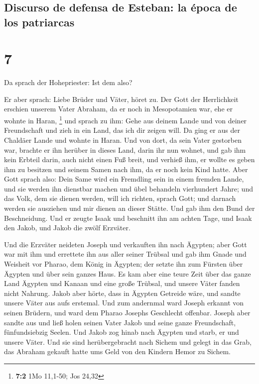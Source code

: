 \hypertarget{discurso-de-defensa-de-esteban-la-uxe9poca-de-los-patriarcas}{%
\subsection{Discurso de defensa de Esteban: la época de los
patriarcas}\label{discurso-de-defensa-de-esteban-la-uxe9poca-de-los-patriarcas}}

\hypertarget{section-6}{%
\section{7}\label{section-6}}

 Da sprach der Hohepriester: Ist dem also?

 Er aber sprach: Liebe Brüder und Väter, höret zu. Der
Gott der Herrlichkeit erschien unserem Vater Abraham, da er noch in
Mesopotamien war, ehe er wohnte in Haran, \footnote{\textbf{7:2} 1Mo
  11,1-50; Jos 24,32}  und sprach zu ihm: Gehe aus deinem
Lande und von deiner Freundschaft und zieh in ein Land, das ich dir
zeigen will.  Da ging er aus der Chaldäer Lande und wohnte
in Haran. Und von dort, da sein Vater gestorben war, brachte er ihn
herüber in dieses Land, darin ihr nun wohnet,  und gab ihm
kein Erbteil darin, auch nicht einen Fuß breit, und verhieß ihm, er
wollte es geben ihm zu besitzen und seinem Samen nach ihm, da er noch
kein Kind hatte.  Aber Gott sprach also: Dein Same wird
ein Fremdling sein in einem fremden Lande, und sie werden ihn dienstbar
machen und übel behandeln vierhundert Jahre;  und das
Volk, dem sie dienen werden, will ich richten, sprach Gott; und darnach
werden sie ausziehen und mir dienen an dieser Stätte.  Und
gab ihm den Bund der Beschneidung. Und er zeugte Isaak und beschnitt ihn
am achten Tage, und Isaak den Jakob, und Jakob die zwölf Erzväter.

 Und die Erzväter neideten Joseph und verkauften ihn nach
Ägypten; aber Gott war mit ihm  und errettete ihn aus
aller seiner Trübsal und gab ihm Gnade und Weisheit vor Pharao, dem
König in Ägypten; der setzte ihn zum Fürsten über Ägypten und über sein
ganzes Haus.  Es kam aber eine teure Zeit über das ganze
Land Ägypten und Kanaan und eine große Trübsal, und unsere Väter fanden
nicht Nahrung.  Jakob aber hörte, dass in Ägypten
Getreide wäre, und sandte unsere Väter aus aufs erstemal.
 Und zum andernmal ward Joseph erkannt von seinen
Brüdern, und ward dem Pharao Josephs Geschlecht offenbar.
 Joseph aber sandte aus und ließ holen seinen Vater Jakob
und seine ganze Freundschaft, fünfundsiebzig Seelen.  Und
Jakob zog hinab nach Ägypten und starb, er und unsere Väter.
 Und sie sind herübergebracht nach Sichem und gelegt in
das Grab, das Abraham gekauft hatte ums Geld von den Kindern Hemor zu
Sichem.


